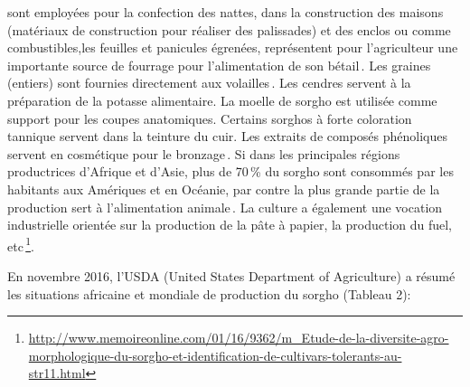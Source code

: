 \documentclass[a4paper,11pt]{article}
\begin{document}
sont employées pour la confection des nattes, dans la construction des
maisons (matériaux de construction pour réaliser des palissades) et
des enclos ou comme combustibles,les feuilles et panicules égrenées,
représentent pour l'agriculteur une importante source de fourrage pour
l'alimentation de son bétail\,\cite{Chantereau_1991}. Les graines
(entiers) sont fournies directement aux
volailles\,\cite{SaintClair_1989}. Les cendres servent à la
préparation de la potasse alimentaire. La moelle de sorgho est
utilisée comme support pour les coupes anatomiques. Certains sorghos à
forte coloration tannique servent dans la teinture du cuir. Les
extraits de composés phénoliques servent en cosmétique pour le
bronzage\,\cite{BARRO_KONDOMBO_2010}. Si dans les principales régions
productrices d'Afrique et d'Asie, plus de 70\,\% du sorgho sont
consommés par les habitants aux Amériques et en Océanie, par contre la
plus grande partie de la production sert à l'alimentation
animale\,\cite{BARRO_KONDOMBO_2010}. La culture a également une
vocation industrielle orientée sur la production de la pâte à papier,
la production du fuel,
etc\,\footnote{\url{http://www.memoireonline.com/01/16/9362/m_Etude-de-la-diversite-agro-morphologique-du-sorgho-et-identification-de-cultivars-tolerants-au-str11.html}}.

En novembre 2016, l'USDA (United States Department of Agriculture) a résumé les situations africaine et mondiale de production du sorgho (Tableau 2):


\end{document}
